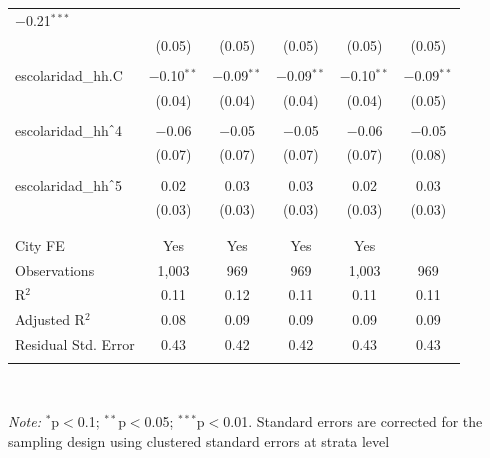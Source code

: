 \begin{table}[H]
\begin{tabularx}{0.9\textwidth}{@{\extracolsep{-7pt}}lccccc}
$-$0.21$^{***}$ \\    & (0.05) & (0.05) & (0.05) & (0.05) & (0.05) \\    & & & & & \\   escolaridad\_hh.C & $-$0.10$^{**}$ & $-$0.09$^{**}$ & $-$0.09$^{**}$ & $-$0.10$^{**}$ & $-$0.09$^{**}$ \\    & (0.04) & (0.04) & (0.04) & (0.04) & (0.05) \\    & & & & & \\   escolaridad\_hh$\hat{\mkern6mu}$4 & $-$0.06 & $-$0.05 & $-$0.05 & $-$0.06 & $-$0.05 \\    & (0.07) & (0.07) & (0.07) & (0.07) & (0.08) \\    & & & & & \\   escolaridad\_hh$\hat{\mkern6mu}$5 & 0.02 & 0.03 & 0.03 & 0.02 & 0.03 \\    & (0.03) & (0.03) & (0.03) & (0.03) & (0.03) \\    & & & & & \\  \hline \\[-1.8ex]  City FE & Yes & Yes & Yes & Yes &  \\  Observations & 1,003 & 969 & 969 & 1,003 & 969 \\  R$^{2}$ & 0.11 & 0.12 & 0.11 & 0.11 & 0.11 \\  Adjusted R$^{2}$ & 0.08 & 0.09 & 0.09 & 0.09 & 0.09 \\  Residual Std. Error & 0.43 & 0.42 & 0.42 & 0.43 & 0.43 \\  \hline  \hline \\[-1.8ex]  \end{tabularx} \\ \parbox[]{\textwidth}{\textit{Note:} $^{*}$p$<$0.1; $^{**}$p$<$0.05; $^{***}$p$<$0.01. Standard errors are corrected for the sampling design using clustered standard errors at strata level }  \end{table} 